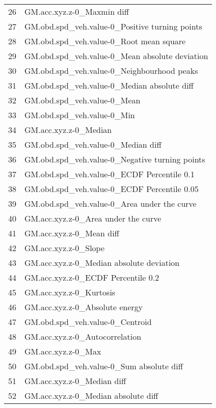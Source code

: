 \begin{tabular}{ll}
26 &                        GM.acc.xyz.z-0\_Maxmin diff \\
27 &    GM.obd.spd\_veh.value-0\_Positive turning points \\
28 &           GM.obd.spd\_veh.value-0\_Root mean square \\
29 &    GM.obd.spd\_veh.value-0\_Mean absolute deviation \\
30 &        GM.obd.spd\_veh.value-0\_Neighbourhood peaks \\
31 &       GM.obd.spd\_veh.value-0\_Median absolute diff \\
32 &                       GM.obd.spd\_veh.value-0\_Mean \\
33 &                        GM.obd.spd\_veh.value-0\_Min \\
34 &                             GM.acc.xyz.z-0\_Median \\
35 &                GM.obd.spd\_veh.value-0\_Median diff \\
36 &    GM.obd.spd\_veh.value-0\_Negative turning points \\
37 &        GM.obd.spd\_veh.value-0\_ECDF Percentile 0.1 \\
38 &       GM.obd.spd\_veh.value-0\_ECDF Percentile 0.05 \\
39 &       GM.obd.spd\_veh.value-0\_Area under the curve \\
40 &               GM.acc.xyz.z-0\_Area under the curve \\
41 &                          GM.acc.xyz.z-0\_Mean diff \\
42 &                              GM.acc.xyz.z-0\_Slope \\
43 &          GM.acc.xyz.z-0\_Median absolute deviation \\
44 &                GM.acc.xyz.z-0\_ECDF Percentile 0.2 \\
45 &                           GM.acc.xyz.z-0\_Kurtosis \\
46 &                    GM.acc.xyz.z-0\_Absolute energy \\
47 &                   GM.obd.spd\_veh.value-0\_Centroid \\
48 &                    GM.acc.xyz.z-0\_Autocorrelation \\
49 &                                GM.acc.xyz.z-0\_Max \\
50 &          GM.obd.spd\_veh.value-0\_Sum absolute diff \\
51 &                        GM.acc.xyz.z-0\_Median diff \\
52 &               GM.acc.xyz.z-0\_Median absolute diff \\

\end{tabular}
